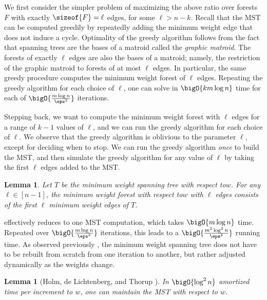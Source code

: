 \documentclass[11pt]{article}
\numberwithin{equation}{section}
\newtheorem{lemma}[theorem]{Lemma}
\theoremstyle{definition}
\theoremstyle{plain}
\newcommand{\weightv}{w}%
\newcommand{\wrt}{with respect to\xspace} %
\begin{document}
We first consider the simpler problem of maximizing the above ratio
over forests $F$ with exactly $\sizeof{F} = \ell$ edges, for some
$\ell > n - k$. Recall that the MST can be computed greedily by
repeatedly adding the minimum weight edge that does not induce a
cycle. Optimality of the greedy algorithm follows from the fact that
spanning trees are the bases of a matroid called the \emph{graphic
  matroid}. The forests of exactly $\ell$ edges are also the bases of
a matroid; namely, the restriction of the graphic matroid to forests
of at most $\ell$ edges. In particular, the same greedy procedure
computes the minimum weight forest of $\ell$ edges. Repeating the
greedy algorithm for each choice of $\ell$, one can solve
 in $\bigO{k m \log n}$ time for each of
\begin{math}
  \bigO{\frac{m \log n}{\eps^2}}
\end{math}
iterations.

Stepping back, we want to compute the minimum weight forest with
$\ell$ edges for a range of $k - 1$ values of $\ell$, and we can run
the greedy algorithm for each choice of $\ell$. We observe that the
greedy algorithm is oblivious to the parameter $\ell$, except for
deciding when to stop. We can run the greedy algorithm \emph{once} to
build the MST, and then simulate the greedy algorithm for any value of
$\ell$ by taking the first $\ell$ edges added to the MST.

\begin{lemma}
   Let $T$ be the minimum weight
  spanning tree \wrt $\weightv$. For any $\ell \in [n-1]$, the minimum
  weight forest \wrt $\weightv$ with $\ell$ edges consists of the
  first $\ell$ minimum weight edges of $T$.
\end{lemma}

 effectively reduces
 to one MST computation, which takes
$\bigO{m\log n}$ time. Repeated over $\bigO{\frac{m \log n}{\eps^2}}$
iterations, this leads to a $\bigO{\frac{m^2 \log^2 n}{\eps^2}}$
running time.  As observed previously \cite{thorup-08,cq-17-soda},
the minimum weight spanning tree does not have to be rebuilt from
scratch from one iteration to another, but rather adjusted dynamically
as the weights change.

\begin{lemma}[{Holm, de Lichtenberg, and Thorup \cite{hlt-01}}]
   In $\bigO{\log^2 n}$ amortized time per
  increment to $\weightv$, one can maintain the MST \wrt
  $\weightv$.
\end{lemma}
\end{document}
